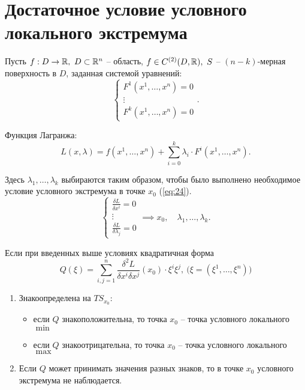 

\section*{Достаточное условие условного локального экстремума}

\begin{note}
    Пусть $f:D\rightarrow\mathbb{R}, \ D \subset \mathbb{R}^n$ -- область, $f \in C^{(2)} (D,\mathbb{R}), \ S$ -- $(n-k)$-мерная поверхность в $D$, заданная системой уравнений:
    \[
        \left\{\begin{array}{l}
            F^1(x^1,\ldots,x^n) = 0 \\
            \vdots                  \\
            F^k(x^1,\ldots,x^n) = 0
        \end{array}\right..
    \]

    Функция Лагранжа:
    \[
        L(x,\lambda) = f(x^1,\ldots,x^n) + \sum_{i = 0}^{k}\lambda_i \cdot F^i(x^1,\ldots,x^n).
    \]

    Здесь $\lambda_1,\ldots,\lambda_k$ выбираются таким образом, чтобы было выполнено необходимое условие условного экстремума в точке $x_0$ (\ref{eq:24}).
    \[
        \left\{\begin{array}{l}
            \frac{\delta L}{\delta x^i} = 0 \\
            \vdots                          \\
            \frac{\delta L}{\delta \lambda_j} = 0
        \end{array}\right. \implies x_0,\quad \lambda_1,\ldots,\lambda_k.
    \]
\end{note}

\newpage

\begin{theorem}
    Если при введенных выше условиях квадратичная форма
    \[
        Q(\xi) = \sum_{i,j=1}^{n}\frac{\delta^2 L}{\delta x^i \delta x^j}(x_0)\cdot\xi^i\xi^j,\ \big(\xi=(\xi^1,\ldots,\xi^n)\big)
    \]
    \begin{enumerate}
        \item Знакоопределена на $TS_{x_0}$:
              \begin{itemize}
                  \item если $Q$ знакоположительна, то точка $x_0$ -- точка условного локального $\min$
                  \item если $Q$ знакоотрицательна, то точка $x_0$ -- точка условного локального $\max$
              \end{itemize}
        \item Если $Q$ может принимать значения разных знаков, то в точке $x_0$ условного экстремума не наблюдается.
    \end{enumerate}
\end{theorem}

